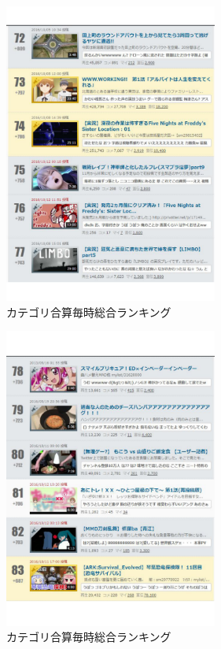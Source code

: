 \begin{figure}[htb]
\centering
\includegraphics[width=7cm]{r13.pdf}
\caption{カテゴリ合算毎時総合ランキング}\label{aca}
\end{figure}

\begin{figure}[htb]
\centering
\includegraphics[width=7cm]{r14.pdf}
\caption{カテゴリ合算毎時総合ランキング}\label{acb}
\end{figure}


